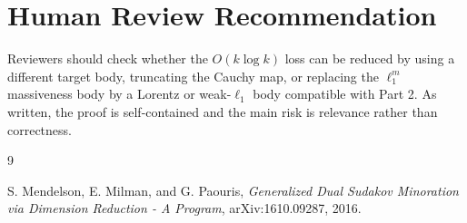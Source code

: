 \documentclass[11pt]{article}
\begin{document}
\section*{Human Review Recommendation}

Reviewers should check whether the \(O(k\log k)\) loss can be reduced by using
a different target body, truncating the Cauchy map, or replacing the \(\ell_1^m\)
massiveness body by a Lorentz or weak-\(\ell_1\) body compatible with Part 2.
As written, the proof is self-contained and the main risk is relevance rather
than correctness.

\begin{thebibliography}{9}

S. Mendelson, E. Milman, and G. Paouris,
\emph{Generalized Dual Sudakov Minoration via Dimension Reduction - A Program},
arXiv:1610.09287, 2016.

\end{thebibliography}
\end{document}
